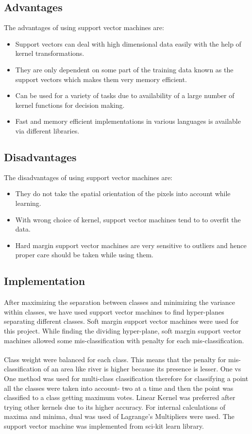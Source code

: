 \documentclass[12pt, a4paper]{report}
\begin{document}
\subsection{Advantages}
The advantages of using support vector machines are:
\begin{itemize}
\item Support vectors can deal with high dimensional data easily with the help of kernel transformations.
\item They are only dependent on some part of the training data known as the support vectors which makes them very memory efficient.
\item Can be used for a variety of tasks due to availability of a large number of kernel functions for decision making.
\item Fast and memory efficient implementations in various languages is available via different libraries.
\end{itemize}
\subsection{Disadvantages}
The disadvantages of using support vector machines are:
\begin{itemize}
\item They do not take the spatial orientation of the pixels into account while learning.
\item With wrong choice of kernel, support vector machines tend to to overfit the data.
\item Hard margin support vector machines are very sensitive to outliers and hence proper care should be taken while using them.
\end{itemize}
\subsection{Implementation}
\paragraph{}
After maximizing the separation between classes and minimizing the variance within classes, we have used support vector machines to find hyper-planes separating different classes. Soft margin support vector machines were used for this project. While finding the dividing hyper-plane, soft margin support vector machines allowed some mis-classification with penalty for each mis-classification. 
\paragraph{}
Class weight were balanced for each class. This means that the penalty for mis-classification of an area like river is higher because its presence is lesser. One vs One method was used for multi-class classification therefore for classifying a point all the classes were taken into account- two at a time and then the point was classified to a class getting maximum votes. Linear Kernel was preferred after trying other kernels due to its higher accuracy. For internal calculations of maxima and minima, dual was used of Lagrange's Multipliers were used. The support vector machine was implemented from sci-kit learn library.
\end{document}
